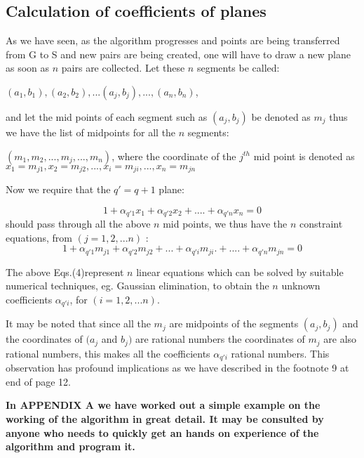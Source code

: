\documentclass[english]{article}
\begin{document}
\subsection{Calculation of coefficients of planes}

As we have seen, as the algorithm progresses and points are being transferred from G to S and new pairs are being created, one will have to draw a new plane as soon as $n$ pairs are collected. Let these $n$ segments be called:

 $(a_{1},b_{1}),(a_{2},b_{2}),...(a_{j},b_{j}),...,(a_{n},b_{n})$,
 
 and let the mid points of each segment such as $(a_{j},b_{j}) $ be denoted as $m_j$ thus we have the list of midpoints for all the $n$ segments:
 
  $( m_1, m_2,...,m_j,...,m_n)$, where the coordinate of the $j^{th}$ mid point is denoted as $x_1=m_{j1}, x_2=m_{j2},...,x_i=m_{ji},...,x_n=m_{jn}  $
  
  Now we require that the $q'=q+1$ plane:  
 
\begin{equation}
1+\alpha_{q'1}x_{1}+\alpha_{q'2}x_{2}+....+\alpha_{q'n}x_{n}= 0 
\end{equation}
should pass through all the above $n$ mid points, we thus have the $n$ constraint equations, from $(j=1,2,...n)$ :
\begin{equation}
1+\alpha_{q'1}m_{j1} +\alpha_{q'2}m_{j2}+...+\alpha_{q'i}m_{ji}.+....+\alpha_{q'n}m_{jn}= 0 
\end{equation}


The above Eqs.(4)represent $n$ linear equations which can be solved by suitable numerical techniques, eg. Gaussian elimination, to obtain the $n$ unknown coefficients $\alpha_{q'i}$, for $(i=1,2,...n)$. 

It may be noted that since all the  $m_j$ are midpoints of the segments $(a_{j},b_{j}) $ and the coordinates of $(a_{j}$ and $b_{j}) $ are rational numbers the coordinates of $m_j$  are also rational numbers, this makes all the coefficients 
$\alpha_{q'i}$ rational numbers. This observation has profound implications as we have described in the footnote 9 at end of page 12.


\medskip{}
 \textbf{ In APPENDIX A we have worked out a simple example on the
working of the algorithm in great detail. It may be consulted by anyone
who needs to quickly get an hands on experience of the algorithm and
program it.} \medskip{}
 
\end{document}

